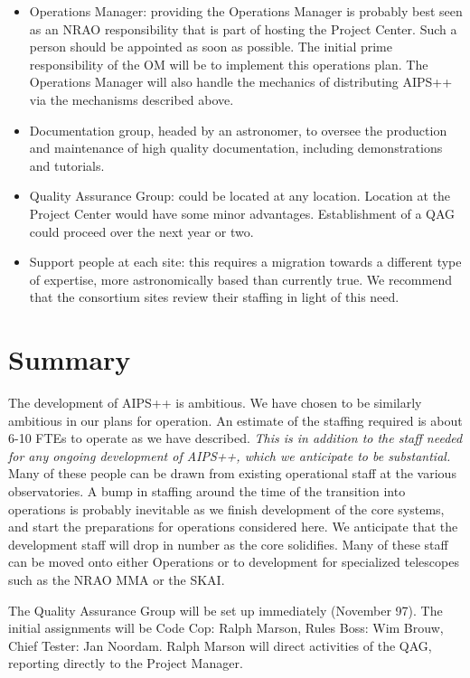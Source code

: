 \begin{itemize}
\item Operations Manager: providing the Operations Manager is probably best 
seen as an NRAO responsibility that is part of hosting the Project Center.
Such a person should be appointed as soon as possible. The initial prime
responsibility of the OM will be to implement this operations plan.
The Operations Manager will also handle the mechanics of distributing AIPS++
via the mechanisms described above.
\item Documentation group, headed by an astronomer, to oversee the
production and maintenance of high quality documentation, including
demonstrations and tutorials.
\item Quality Assurance Group: could be located at any location. Location 
at the Project Center would have some minor advantages. Establishment of
a QAG could proceed over the next year or two. 
\item Support people at each site: this requires a migration towards a
different type of expertise, more astronomically based than currently
true. We recommend that the consortium sites review their staffing
in light of this need.
\end{itemize}


\section{Summary}

The development of AIPS++ is ambitious. We have chosen to be similarly
ambitious in our plans for operation. An estimate of the staffing
required is about 6-10 FTEs to operate as we have described.  {\em
This is in addition to the staff needed for any ongoing development of
AIPS++, which we anticipate to be substantial.}  Many of these people
can be drawn from existing operational staff at the various
observatories.  A bump in staffing around the time of the transition
into operations is probably inevitable as we finish development of the
core systems, and start the preparations for operations considered
here. We anticipate that the development staff will drop in number as
the core solidifies. Many of these staff can be moved onto either
Operations or to development for specialized telescopes such as the
NRAO MMA or the SKAI.

The Quality Assurance Group will be set up immediately (November
97). The initial assignments will be Code Cop: Ralph Marson, Rules
Boss: Wim Brouw, Chief Tester: Jan Noordam. Ralph Marson will
direct activities of the QAG, reporting directly to the Project
Manager.
